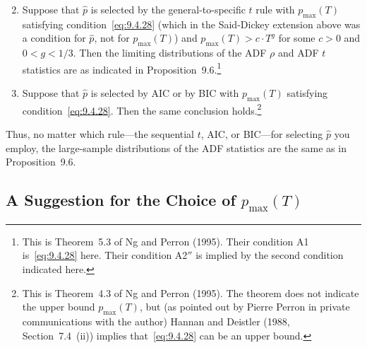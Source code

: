 \begin{enumerate}
\setcounter{enumi}{1}
\item Suppose that $\hat{p}$ is selected by the general-to-specific $t$ rule with $p_{\max}(T)$ satisfying condition~\eqref{eq:9.4.28} (which in the Said-Dickey extension above was a
condition for $\hat{p}$, not for $p_{\max}(T)$) and $p_{\max}(T) > c \cdot T^g$ for some $c > 0$ and
$0 < g < 1/3$. Then the limiting distributions of the ADF $\rho$ and ADF $t$ statistics
are as indicated in Proposition~9.6.\footnote{This is Theorem~5.3 of Ng and Perron (1995). Their condition A1 is~\eqref{eq:9.4.28} here. Their condition A2$''$ is
implied by the second condition indicated here.}

\item Suppose that $\hat{p}$ is selected by AIC or by BIC with $p_{\max}(T)$ satisfying condition~\eqref{eq:9.4.28}. Then the same conclusion holds.\footnote{This is Theorem~4.3 of Ng and Perron (1995). The theorem does not indicate the upper bound $p_{\max}(T)$, but
(as pointed out by Pierre Perron in private communications with the author) Hannan and Deistler (1988, Section~7.4~(ii)) implies that~\eqref{eq:9.4.28} can be an upper bound.}
\end{enumerate}

Thus, no matter which rule---the sequential $t$, AIC, or BIC---for selecting $\hat{p}$ you
employ, the large-sample distributions of the ADF statistics are the same as in
Proposition~9.6.

\subsection*{A Suggestion for the Choice of $p_{\max}(T)$}

